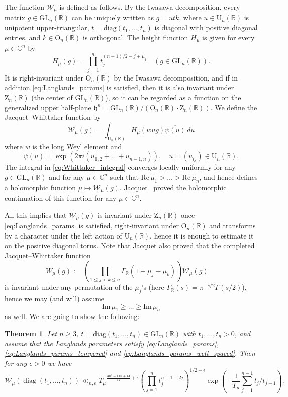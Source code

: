 \documentclass[11pt, oneside]{amsart}
\theoremstyle{plain}
\newtheorem{theorem}{Theorem}[section]
\theoremstyle{remark}
\newcommand{\R}{\mathbb{R}}
\newcommand{\C}{\mathbb{C}}
\renewcommand{\C}{\mathbb{C}}
\newcommand{\im}{\mathrm{Im}\,}
\newcommand{\ree}{\mathrm{Re}\,}
\DeclareMathOperator{\diag}{diag}
\begin{document}
The function $\mathcal{W}_\mu$ is defined as follows. By the Iwasawa decomposition,
every matrix $g\in\mathrm{GL}_n(\R)$ can be uniquely written as $g=utk$, where
$u\in \mathrm{U}_n(\R)$ is unipotent upper-triangular,
$t=\mathrm{diag}(t_1,\dots,t_n)$ is diagonal with positive diagonal entries,
and $k\in\mathrm{O}_n(\R)$ is orthogonal.
The height function $H_\mu$ is given for every $\mu\in\C^n$ by
\[
H_\mu(g)=\prod_{j= 1}^nt_j^{(n+1)/2-j+ \mu_j}\quad (g\in\mathrm{GL}_n(\R)).
\]
It is right-invariant 
under $\mathrm O_n(\R)$ by the Iwasawa decomposition, and if in
addition \eqref{eq:Langlands_params} 
is satisfied, 
then it is also invariant under $\mathrm Z_n(\R)$ (the center of $\mathrm{GL}_n(\R)$), so
it can be regarded as a function on 
the generalized upper half-plane
$\mathfrak h^n = \mathrm{GL}_n(\R)/(\mathrm O_n(\R)\cdot \mathrm Z_n(\R))$.
We define the Jacquet–Whittaker function by
\begin{equation}\label{eq:Whittaker_integral}
\mathcal W_\mu(g)=\int_{\mathrm U_n(\R)}
H_\mu(wug)\overline{\psi(u)}\,du
\end{equation}
where  $w$ is the long Weyl element and
\[
\psi(u)=\exp(2\pi i (u_{1,2}+\dots+u_{n-1,n})), \quad u = (u_{ij})\in \mathrm  U_n(\R).
\]
The integral in \eqref{eq:Whittaker_integral}
converges locally uniformly for any $g\in \mathrm{GL}_n(\R)$ and for any $\mu\in\C^n$ such
that $\ree\mu_1>\dots>\ree \mu_n$, and hence defines a holomorphic function $\mu\mapsto \mathcal W_\mu(g)$.
 Jacquet~\cite{Ja} proved the holomorphic continuation of this function
 for any $\mu\in\C^n$. 
 
 All this implies that  $\mathcal W_\mu(g)$  is invariant under $\mathrm Z_n(\R)$
 once \eqref{eq:Langlands_params}
 is satisfied,
right-invariant under $\mathrm O_n(\R)$
and  transforms by
a character under the left action of $\mathrm U_n(\R)$,
hence it is enough to estimate it 
 on the positive diagonal torus.
 Note that Jacquet \cite{Ja} also proved that
 the completed  Jacquet–Whittaker function
 \[
W_\mu(g):=\left(\prod_{1\leq j<k\leq n}\Gamma_\R(1+\mu_j-\mu_k)\right)\mathcal{W}_\mu(g)\,\quad
 \]
 is invariant under any permutation of the $\mu_j$'s
 (here $\Gamma_\R(s)=\pi^{-s/2}\Gamma(s/2)$), hence
 we may (and will) assume
 \[
\im \mu_1\geq \dots \geq \im \mu_n
\]
as well.
 We are going to show the following:


\begin{theorem}\label{thm:main_thm}
Let $n\geq3$, $t=\mathrm{diag}(t_1,\dots,t_n)\in \mathrm{GL}_n(\R)$ with
$t_1,\dots,t_n>0$, and assume that the Langlands parameters 
satisfy \eqref{eq:Langlands_params},
\eqref{eq:Langlands_params_tempered} and \eqref{eq:Langlands_params_well_spaced}. 
Then for any $\epsilon>0$ we have
\begin{equation}\label{eq:main_thm_eq}
\mathcal W_\mu(\diag(t_1,\dots,t_{n}))
\ll_{n,\epsilon} 
T_\mu^{-\frac{3n^2-11n+14}{12}+\epsilon}
\left(\prod_{j=1}^nt_j^{n+1-2j}\right)^{1/2-\epsilon}
\exp \left(-\frac{1}{T_\mu}\sum_{j=1}^{n-1} t_j/t_{j+1}\right).
\end{equation}
\end{theorem}
\end{document}
